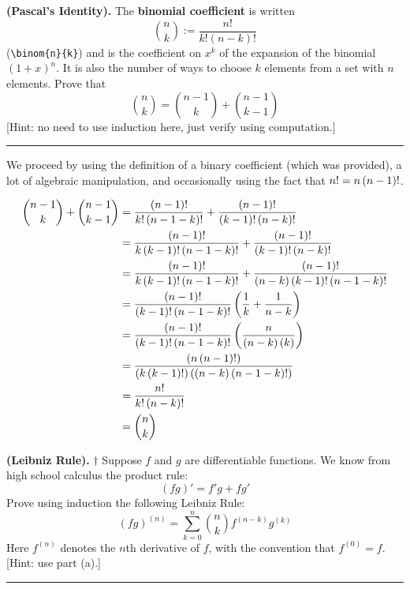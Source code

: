\documentclass{article}
\begin{document}
\problem{}

\subproblema{}

\textbf{(Pascal's Identity).}
The \textbf{binomial coefficient} is written \[\binom{n}{k}:=\frac{n!}{k!(n-k)!}\] (\verb|\binom{n}{k}|) and is the coefficient on $x^k$ of the expansion of the binomial $(1+x)^n$.
It is also the number of ways to choose $k$ elements from a set with $n$ elements.
Prove that \[\binom{n}{k}=\binom{n-1}{k}+\binom{n-1}{k-1}\]
[Hint: no need to use induction here, just verify using computation.]
\hrule
We proceed by using the definition of a binary coefficient (which was provided), a lot of algebraic manipulation, and occasionally using the fact that $n! = n \left (n-1 \right)!$.

\begin{align*}
  \binom{n-1}{k} + \binom{n-1}{k-1} &= \frac{\left (n-1 \right)!}{k! \left (n-1-k \right)!} + \frac{\left (n-1 \right)!}{\left (k-1 \right)! \left (n-k \right)!} \\
                                    &= \frac{\left (n-1 \right)!}{k \left (k-1 \right)! \left (n-1-k \right)!} + \frac{\left (n-1 \right)!}{\left (k-1 \right)! \left (n-k \right)!} \\
                                    &= \frac{\left (n-1 \right)!}{k \left (k-1 \right)! \left (n-1-k \right)!} + \frac{\left (n-1 \right)!}{\left (n-k \right)\left (k-1 \right)! \left (n-1-k \right)!} \\
                                    &= \frac{\left (n-1 \right)!}{\left (k-1 \right)! \left (n-1-k \right)!} \left (\frac{1}{k} + \frac{1}{n-k} \right) \\
                                    &= \frac{\left (n-1 \right)!}{\left (k-1 \right)! \left (n-1-k \right)!} \left (\frac{n}{\left (n-k \right) \left (k \right)} \right) \\
                                    &= \frac{\left (n \left (n-1 \right)! \right)}{\left (k \left (k-1 \right)! \right) \left (\left (n-k \right)\left (n-1-k \right)! \right)} \\
                                    &= \frac{n!}{k! \left (n-k \right)!} \\
                                    &= \binom{n}{k} \\
\end{align*}

\subproblemat{}

\textbf{(Leibniz Rule).}
$\dagger$ Suppose $f$ and $g$ are differentiable functions.
We know from high school calculus the product rule: \[(fg)'=f'g+fg'\]
Prove using induction the following Leibniz Rule: \[(fg)^{(n)}= \sum_{k=0}^n \binom{n}{k}f^{(n-k)}g^{(k)}\]
Here $f^{(n)}$ denotes the $n$th derivative of $f$, with the convention that $f^{(0)}=f$.
[Hint: use part (a).]

\hrule
\end{document}
